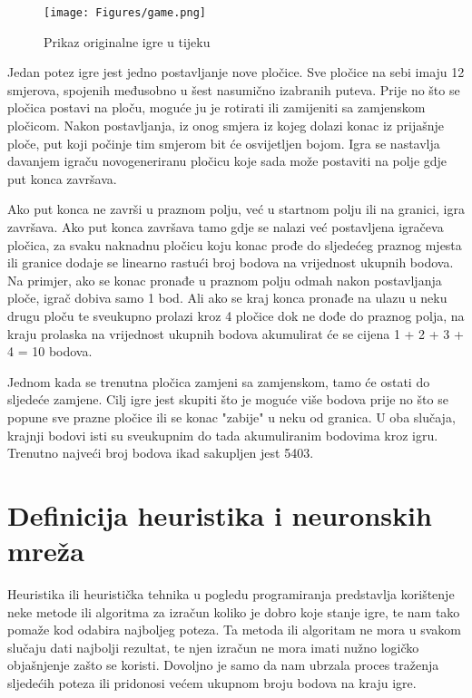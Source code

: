 \documentclass[zavrsnirad]{fer}
\begin{document}
\begin{figure}[htb]
	\centering
	\texttt{[image: Figures/game.png]} 
	\caption{Prikaz originalne igre u tijeku}
	\label{slk:game_screen}
\end{figure}

Jedan potez igre jest jedno postavljanje nove pločice. Sve pločice na sebi imaju 12 smjerova, spojenih međusobno u šest nasumično izabranih puteva. Prije no što se pločica postavi na ploču, moguće ju je rotirati ili zamijeniti sa zamjenskom pločicom. Nakon postavljanja, iz onog smjera iz kojeg dolazi konac iz prijašnje ploče, put koji počinje tim smjerom bit će osvijetljen bojom. Igra se nastavlja davanjem igraču novogeneriranu pločicu koje sada može postaviti na polje gdje put konca završava.

Ako put konca ne završi u praznom polju, već u startnom polju ili na granici, igra završava. Ako put konca završava tamo gdje se nalazi već postavljena igračeva pločica, za svaku naknadnu pločicu koju konac prođe do sljedećeg praznog mjesta ili granice dodaje se linearno rastući broj bodova na vrijednost ukupnih bodova. Na primjer, ako se konac pronađe u praznom polju odmah nakon postavljanja ploče, igrač dobiva samo 1 bod. Ali ako se kraj konca pronađe na ulazu u neku drugu ploču te sveukupno prolazi kroz 4 pločice dok ne dođe do praznog polja, na kraju prolaska na vrijednost ukupnih bodova akumulirat će se cijena 1 + 2 + 3 + 4 = 10 bodova.

Jednom kada se trenutna pločica zamjeni sa zamjenskom, tamo će ostati do sljedeće zamjene. Cilj igre jest skupiti što je moguće više bodova prije no što se popune sve prazne pločice ili se konac "zabije" u neku od granica. U oba slučaja, krajnji bodovi isti su sveukupnim do tada akumuliranim bodovima kroz igru. Trenutno najveći broj bodova ikad sakupljen jest 5403.

\section{Definicija heuristika i neuronskih mreža}
\label{pog:opis_heuristika_i_neuronskih}


Heuristika ili heuristička tehnika u pogledu programiranja predstavlja korištenje neke metode ili algoritma za izračun koliko je dobro koje stanje igre, te nam tako pomaže kod odabira najboljeg poteza. Ta metoda ili algoritam ne mora u svakom slučaju dati najbolji rezultat, te njen izračun ne mora imati nužno logičko objašnjenje zašto se koristi. Dovoljno je samo da nam ubrzala proces traženja sljedećih poteza ili pridonosi većem ukupnom broju bodova na kraju igre.
\end{document}
